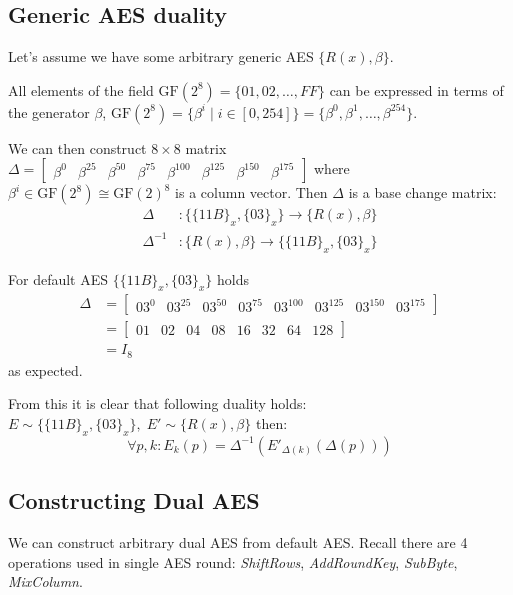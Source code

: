 \documentclass[11pt,oneside,final]{fithesis2}
\newcommand{\gfe}{\ensuremath{\text{GF}\left(2^8\right)}}
\begin{document}
	\subsection{Generic AES duality}
	Let's assume we have some arbitrary generic AES $\{R(x), \beta \}$. 

	All elements of the field $\gfe = \{01, 02, \dots, FF\}$
	can be expressed in terms of the generator $\beta$, $\gfe = \{\beta^i \; | \; i \in [0,254]\} = \{\beta^0, \beta^1, \dots, \beta^{254}\}$.

	We can then construct $8 \times 8$ matrix $\Delta = \begin{bmatrix} \beta^0 & \beta^{25} & \beta^{50} & \beta^{75} & \beta^{100} & \beta^{125} & \beta^{150} & \beta^{175}  \end{bmatrix}$ where 
	$\beta^i \in \gfe \cong \text{GF}(2)^8$ is a column vector. Then $\Delta$ is a base change matrix:
	\begin{subequations}
	\begin{align}
	    \Delta &: \{\{11B\}_x, \{03\}_x\}  \longrightarrow \{R(x), \beta \} \\
	    \Delta^{-1} &: \{R(x), \beta \}  \longrightarrow \{\{11B\}_x, \{03\}_x\}
	\end{align}
	\end{subequations}

	For default AES $\{\{11B\}_x, \{03\}_x\}$ holds
	\begin{align*}
	    \Delta &= \begin{bmatrix} 03^0 & 03^{25} & 03^{50} & 03^{75} & 03^{100} & 03^{125} & 03^{150} & 03^{175}  \end{bmatrix} \\
	           &= \begin{bmatrix} 01 & 02 & 04 & 08 & 16 & 32 & 64 & 128 \end{bmatrix} \\
		   &= I_8
	\end{align*}
	as expected.

	From this it is clear that following duality holds: $E \sim \{\{11B\}_x, \{03\}_x\}, \; E' \sim \{R(x), \beta \}$ then:
	\begin{equation} 
	\forall p, k: E_k(p) = \Delta^{-1}\left(E'_{\Delta(k)}(\Delta(p))\right)
	\end{equation}

	\subsection{Constructing Dual AES}
	We can construct arbitrary dual AES from default AES. Recall there are 4 operations used in single AES round: \emph{ShiftRows}, \emph{AddRoundKey}, \emph{SubByte}, \emph{MixColumn}.
\end{document}
